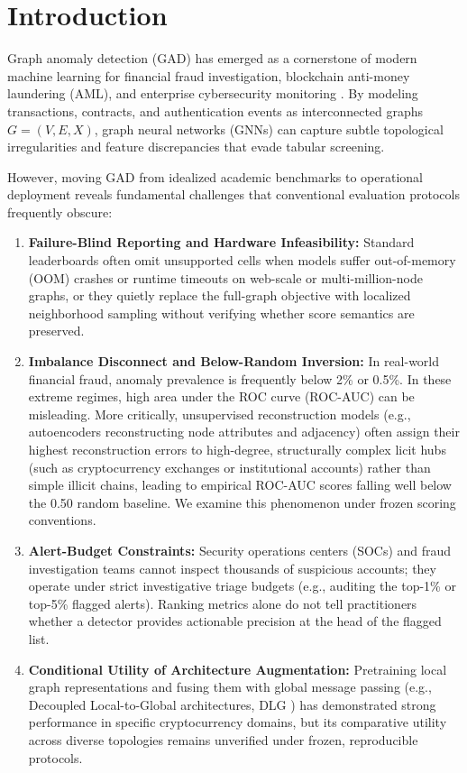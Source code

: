 \documentclass[11pt,a4paper]{article}
\begin{document}
\section{Introduction}
\label{sec:introduction}
Graph anomaly detection (GAD) has emerged as a cornerstone of modern machine learning for financial fraud investigation, blockchain anti-money laundering (AML), and enterprise cybersecurity monitoring \cite{ma2023survey,qiao2025survey,dilini2026comprehensive}. By modeling transactions, contracts, and authentication events as interconnected graphs $G=(V, E, X)$, graph neural networks (GNNs) can capture subtle topological irregularities and feature discrepancies that evade tabular screening.

However, moving GAD from idealized academic benchmarks to operational deployment reveals fundamental challenges that conventional evaluation protocols frequently obscure:
\begin{enumerate}
    \item \textbf{Failure-Blind Reporting and Hardware Infeasibility:} Standard leaderboards often omit unsupported cells when models suffer out-of-memory (OOM) crashes or runtime timeouts on web-scale or multi-million-node graphs, or they quietly replace the full-graph objective with localized neighborhood sampling without verifying whether score semantics are preserved.
    \item \textbf{Imbalance Disconnect and Below-Random Inversion:} In real-world financial fraud, anomaly prevalence is frequently below 2\% or 0.5\%. In these extreme regimes, high area under the ROC curve (ROC-AUC) can be misleading. More critically, unsupervised reconstruction models (e.g., autoencoders reconstructing node attributes and adjacency) often assign their highest reconstruction errors to high-degree, structurally complex licit hubs (such as cryptocurrency exchanges or institutional accounts) rather than simple illicit chains, leading to empirical ROC-AUC scores falling well below the 0.50 random baseline. We examine this phenomenon under frozen scoring conventions.
    \item \textbf{Alert-Budget Constraints:} Security operations centers (SOCs) and fraud investigation teams cannot inspect thousands of suspicious accounts; they operate under strict investigative triage budgets (e.g., auditing the top-1\% or top-5\% flagged alerts). Ranking metrics alone do not tell practitioners whether a detector provides actionable precision at the head of the flagged list.
    \item \textbf{Conditional Utility of Architecture Augmentation:} Pretraining local graph representations and fusing them with global message passing (e.g., Decoupled Local-to-Global architectures, DLG \cite{park2026dlg}) has demonstrated strong performance in specific cryptocurrency domains, but its comparative utility across diverse topologies remains unverified under frozen, reproducible protocols.
\end{enumerate}
\end{document}
